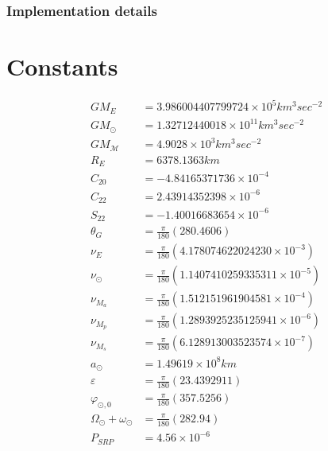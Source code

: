 \documentclass{article}
\begin{document}
\subsubsection{Implementation details}
\section{Constants}

\begin{align}
GM_E &=3.986004407799724\times 10^5 km^3 sec^{-2} \\
GM_\odot &= 1.32712440018\times 10^{11}km^3 sec^{-2} \\
GM_{\mathcal M} &=4.9028\times 10^{3}km^3 sec^{-2} \\
R_E &=6378.1363 km\\
C_{20} &= -4.84165371736\times 10^{-4}\\
C_{22} &= 2.43914352398\times 10^{-6}\\
S_{22} &=-1.40016683654\times 10^{-6}\\
\theta_G &= \frac{\pi}{180} (280.4606)\\
\nu_E  &= \frac{\pi}{180} (4.178074622024230\times 10^{-3})\\
\nu_\odot &= \frac{\pi}{180} (1.1407410259335311\times 10^{-5})\\
\nu_{M_a} &= \frac{\pi}{180} (1.512151961904581\times 10^{-4})\\
\nu_{M_p} &= \frac{\pi}{180} (1.2893925235125941\times 10^{-6})\\
\nu_{M_s} &= \frac{\pi}{180} (6.128913003523574\times 10^{-7})\\
a_\odot &= 1.49619 \times 10^8 km\\
\varepsilon&= \frac{\pi}{180}(23.4392911)\\
\varphi_{\odot,0} &= \frac{\pi}{180} (357.5256)\\
\Omega_\odot + \omega_\odot &= \frac{\pi}{180} (282.94) \\
P_{SRP} &=4.56\times 10^{-6}
\end{align}
\end{document}
